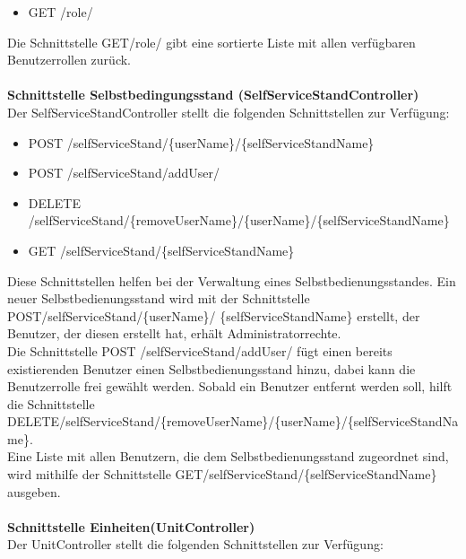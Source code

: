 \begin{itemize}
	\itemsep0pt
	\item  GET /role/
\end{itemize}

Die Schnittstelle GET/role/ gibt eine sortierte Liste mit allen verfügbaren Benutzerrollen zurück.
\\
\\
\textbf{Schnittstelle Selbstbedingungsstand (SelfServiceStandController)}
\\
Der SelfServiceStandController stellt die folgenden Schnittstellen zur Verfügung:

\begin{itemize}
	\itemsep0pt
	\item  POST /selfServiceStand/\{userName\}/\{selfServiceStandName\}
	\item  POST /selfServiceStand/addUser/
	\item  DELETE /selfServiceStand/\{removeUserName\}/\{userName\}/\{selfServiceStandName\}
	\item GET /selfServiceStand/\{selfServiceStandName\}
\end{itemize}


Diese Schnittstellen helfen bei der Verwaltung eines Selbstbedienungsstandes. Ein neuer Selbstbedienungsstand wird mit der Schnittstelle POST/selfServiceStand/\{userName\}/ \{selfServiceStandName\} erstellt, der Benutzer, der diesen erstellt hat, erhält Administratorrechte.
\\
Die Schnittstelle POST /selfServiceStand/addUser/ fügt einen bereits existierenden Benutzer einen Selbstbedienungsstand hinzu, dabei kann die Benutzerrolle frei gewählt werden. Sobald ein Benutzer entfernt werden soll, hilft die Schnittstelle DELETE/selfServiceStand/\{removeUserName\}/\{userName\}/\{selfServiceStandName\}.
\\
Eine Liste mit allen Benutzern, die dem Selbstbedienungsstand zugeordnet sind, wird mithilfe der Schnittstelle GET/selfServiceStand/\{selfServiceStandName\} ausgeben.
\\
\\
\textbf{Schnittstelle Einheiten(UnitController)}
\\
Der UnitController stellt die folgenden Schnittstellen zur Verfügung:

